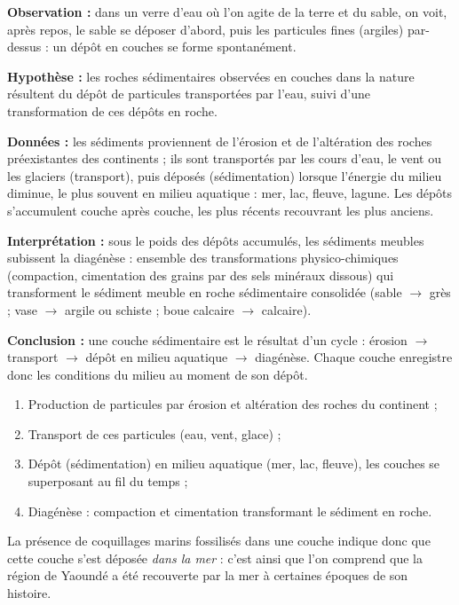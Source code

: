 \documentclass[11pt]{article}
\newcommand{\cle}[1]{{\popxbold\color{popdark}#1}}
\begin{document}
\begin{experience}
\textbf{Observation :} dans un verre d'eau où l'on agite de la terre et du sable, on voit, après repos, le sable se déposer d'abord, puis les particules fines (argiles) par-dessus : un dépôt en couches se forme spontanément.

\textbf{Hypothèse :} les roches sédimentaires observées en couches dans la nature résultent du dépôt de particules transportées par l'eau, suivi d'une transformation de ces dépôts en roche.

\textbf{Données :} les sédiments proviennent de l'\cle{érosion} et de l'\cle{altération} des roches préexistantes des continents ; ils sont transportés par les cours d'eau, le vent ou les glaciers (\cle{transport}), puis déposés (\cle{sédimentation}) lorsque l'énergie du milieu diminue, le plus souvent en \cle{milieu aquatique} : mer, lac, fleuve, lagune. Les dépôts s'accumulent couche après couche, les plus récents recouvrant les plus anciens.

\textbf{Interprétation :} sous le poids des dépôts accumulés, les sédiments meubles subissent la \cle{diagénèse} : ensemble des transformations physico-chimiques (compaction, cimentation des grains par des sels minéraux dissous) qui transforment le sédiment meuble en roche sédimentaire consolidée (sable $\rightarrow$ grès ; vase $\rightarrow$ argile ou schiste ; boue calcaire $\rightarrow$ calcaire).

\textbf{Conclusion :} une couche sédimentaire est le résultat d'un cycle : érosion $\rightarrow$ transport $\rightarrow$ dépôt en milieu aquatique $\rightarrow$ diagénèse. Chaque couche enregistre donc les conditions du milieu au moment de son dépôt.
\end{experience}

\begin{aretenir}
\begin{enumerate}
\item Production de particules par érosion et altération des roches du continent ;
\item Transport de ces particules (eau, vent, glace) ;
\item Dépôt (sédimentation) en milieu aquatique (mer, lac, fleuve), les couches se superposant au fil du temps ;
\item Diagénèse : compaction et cimentation transformant le sédiment en roche.
\end{enumerate}
La présence de coquillages marins fossilisés dans une couche indique donc que cette couche s'est déposée \emph{dans la mer} : c'est ainsi que l'on comprend que la région de Yaoundé a été recouverte par la mer à certaines époques de son histoire.
\end{aretenir}
\end{document}
